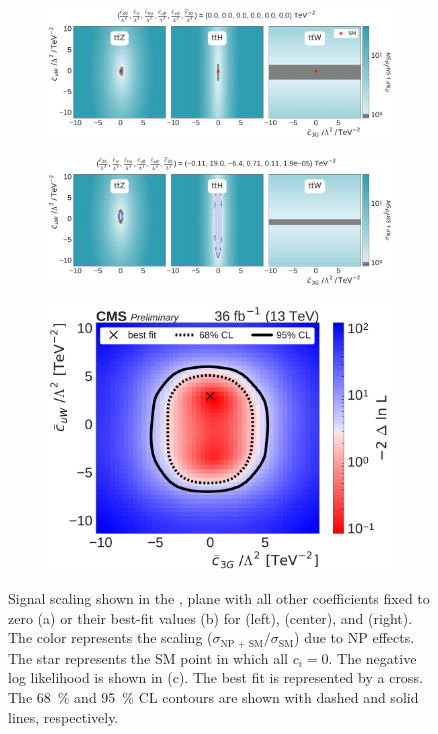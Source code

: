 \begin{figure}
  \vspace{-1cm}
  \begin{subfigure}{\linewidth}
    \centering
    \includegraphics[width=\linewidth]{figures/thirteen-TeV/scaling-frozen/c3G_cuW}
    \caption{}
  \end{subfigure}
  \begin{subfigure}{\linewidth}
    \centering
    \includegraphics[width=\linewidth]{figures/thirteen-TeV/scaling/c3G_cuW}
    \caption{}
  \end{subfigure}
  \begin{subfigure}{\linewidth}
    \centering
    \includegraphics[width=0.6\linewidth]{figures/thirteen-TeV/nll/c3G_cuW}
    \caption{}
  \end{subfigure}
  \vspace{-1cm}
  \setlength{\capwidth}{15cm}
  \caption[Signal scaling and profile likelihood scan in the \cthreeG, \cuW plane]{Signal scaling
  shown in the \cthreeG, \cuW plane with all other coefficients fixed to zero (a) or their best-fit
  values (b) for \ttZ (left), \ttH (center), and \ttW (right). The color represents the scaling
  ($\sigma_\text{NP + SM} / \sigma_\text{SM}$) due to NP effects. The star represents the SM point in
  which all $c_i=0$. The negative log likelihood is shown in (c). The best fit is represented by a
  cross. The \SI{68}{\percent} and \SI{95}{\percent} CL contours are shown with dashed and solid
  lines, respectively.}
\end{figure}

